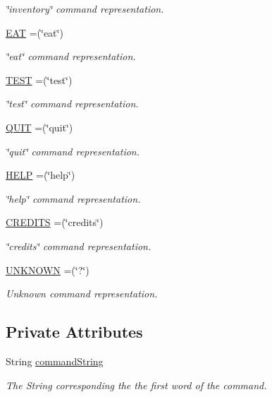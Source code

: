 \begin{DoxyCompactItemize}
\begin{DoxyCompactList}\small\item\em \char`\"{}inventory\char`\"{} command representation. \end{DoxyCompactList}\item 
\hyperlink{enumCommandWord_a8a3ddfcc3d3f62697323325970089d95}{E\-A\-T} =(\char`\"{}eat\char`\"{})
\begin{DoxyCompactList}\small\item\em \char`\"{}eat\char`\"{} command representation. \end{DoxyCompactList}\item 
\hyperlink{enumCommandWord_a12071308fc3289269d190f8fe5dd95b4}{T\-E\-S\-T} =(\char`\"{}test\char`\"{})
\begin{DoxyCompactList}\small\item\em \char`\"{}test\char`\"{} command representation. \end{DoxyCompactList}\item 
\hyperlink{enumCommandWord_aa606b7593e9ff8c395e091a0f726e348}{Q\-U\-I\-T} =(\char`\"{}quit\char`\"{})
\begin{DoxyCompactList}\small\item\em \char`\"{}quit\char`\"{} command representation. \end{DoxyCompactList}\item 
\hyperlink{enumCommandWord_a8689456b5990b4dfa2c69427a862784d}{H\-E\-L\-P} =(\char`\"{}help\char`\"{})
\begin{DoxyCompactList}\small\item\em \char`\"{}help\char`\"{} command representation. \end{DoxyCompactList}\item 
\hyperlink{enumCommandWord_aff84c19093cea7bf97301062fe61e0a4}{C\-R\-E\-D\-I\-T\-S} =(\char`\"{}credits\char`\"{})
\begin{DoxyCompactList}\small\item\em \char`\"{}credits\char`\"{} command representation. \end{DoxyCompactList}\item 
\hyperlink{enumCommandWord_a7fac6077f2157eb151a67206fd39c3b9}{U\-N\-K\-N\-O\-W\-N} =(\char`\"{}?\char`\"{})
\begin{DoxyCompactList}\small\item\em Unknown command representation. \end{DoxyCompactList}\end{DoxyCompactItemize}
\subsection*{Private Attributes}
\begin{DoxyCompactItemize}
\item 
String \hyperlink{enumCommandWord_ae396b905ac83b5717c56b67e1e47aeef}{command\-String}
\begin{DoxyCompactList}\small\item\em The String corresponding the the first word of the command. \end{DoxyCompactList}\end{DoxyCompactItemize}



